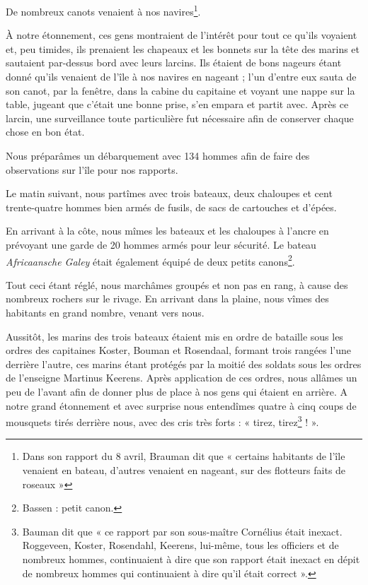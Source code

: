 \documentclass{article}
\begin{document}
        
    De nombreux canots venaient à nos navires\footnote{Dans son rapport du 8 avril, Brauman dit que « certains habitants de l'île venaient en bateau, d'autres venaient en nageant, sur des flotteurs faits de roseaux »}.
            
        
    À notre étonnement, ces gens montraient de l'intérêt pour tout ce qu'ils voyaient et, peu timides, ils prenaient les chapeaux et les bonnets sur la tête des marins et sautaient par-dessus bord avec leurs larcins. Ils étaient de bons nageurs étant donné qu'ils venaient de l'île à nos navires en nageant ; l'un d'entre eux sauta de son canot, par la fenêtre, dans la cabine du capitaine et voyant une nappe sur la table, jugeant que c'était une bonne prise, s'en empara et partit avec. Après ce larcin, une surveillance toute particulière fut nécessaire afin de conserver chaque chose en bon état.
            
        
    Nous préparâmes un débarquement avec 134 hommes afin de faire des observations sur l'île pour nos rapports.
            
        
    Le matin suivant, nous partîmes avec trois bateaux, deux chaloupes et cent trente-quatre hommes bien armés de fusils, de sacs de cartouches et d'épées.
            
        
    En arrivant à la côte, nous mîmes les bateaux et les chaloupes à l'ancre en prévoyant une garde de 20 hommes armés pour leur sécurité. Le bateau \textit{Africaansche Galey} était également équipé de deux petits canons\footnote{Bassen : petit canon.}.
            
        
    Tout ceci étant réglé, nous marchâmes groupés et non pas en rang, à cause des nombreux rochers sur le rivage. En arrivant dans la plaine, nous vîmes des habitants en grand nombre, venant vers nous.
            
        
    Aussitôt, les marins des trois bateaux étaient mis en ordre de bataille sous les ordres des capitaines Koster, Bouman et Rosendaal, formant trois rangées l'une derrière l'autre, ces marins étant protégés par la moitié des soldats sous les ordres de l'enseigne Martinus Keerens. Après application de ces ordres, nous allâmes un peu de l'avant afin de donner plus de place à nos gens qui étaient en arrière. A notre grand étonnement et avec surprise nous entendîmes quatre à cinq coups de mousquets tirés derrière nous, avec des cris très forts : « tirez, tirez\footnote{Bauman dit que « ce rapport par son sous-maître Cornélius était inexact. Roggeveen, Koster, Rosendahl, Keerens, lui-même, tous les officiers et de nombreux hommes, continuaient à dire que son rapport était inexact en dépit de nombreux hommes qui continuaient à dire qu'il était correct ».} ! ».
            
\end{document}
